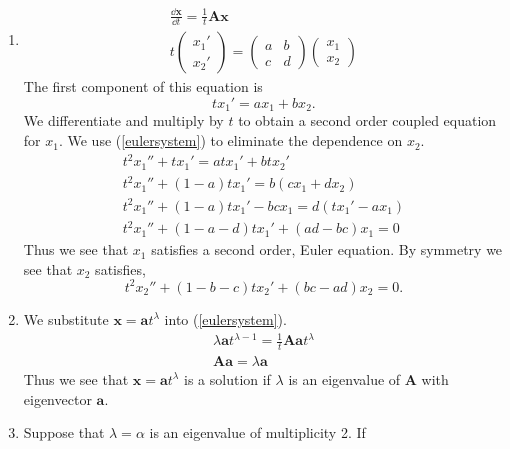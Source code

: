 {%
\begin{Solution}
  \label{solution dxdt=1tAx}
  \begin{enumerate}
  \item
    \begin{gather*}
      \frac{\dd \mathbf{x}}{\dd t} = \frac{1}{t} \mathbf{A} \mathbf{x} \\
      t \begin{pmatrix} x_1' \\ x_2' \end{pmatrix} = 
      \begin{pmatrix} a & b \\ c & d \end{pmatrix}
      \begin{pmatrix} x_1 \\ x_2 \end{pmatrix}
    \end{gather*}
    The first component of this equation is
    \[
    t x_1' = a x_1 + b x_2.
    \]
    We differentiate and multiply by $t$ to obtain a second order coupled 
    equation for $x_1$.  We use (\ref{eulersystem}) to eliminate the 
    dependence on $x_2$.
    \begin{gather*}
      t^2 x_1'' + t x_1' = a t x_1' + b t x_2' \\
      t^2 x_1'' + (1 - a) t x_1' = b (c x_1 + d x_2) \\
      t^2 x_1'' + (1 - a) t x_1' - b c x_1 =  d (t x_1' - a x_1) \\
      t^2 x_1'' + (1 - a - d) t x_1' + (a d - b c) x_1 = 0
    \end{gather*}
    Thus we see that $x_1$ satisfies a second order, Euler equation.  By
    symmetry we see that $x_2$ satisfies,
    \[
    t^2 x_2'' + (1 - b - c) t x_2' + (b c - a d) x_2 = 0.
    \]
  \item
    We substitute $\mathbf{x} = \mathbf{a} t^\lambda$ into (\ref{eulersystem}).
    \begin{gather*}
      \lambda \mathbf{a} t^{\lambda-1} = \frac{1}{t} \mathbf{A} \mathbf{a} t^{\lambda} \\
      \mathbf{A} \mathbf{a} = \lambda \mathbf{a}
    \end{gather*}
    Thus we see that $\mathbf{x} = \mathbf{a} t^{\lambda}$ is a solution if $\lambda$ 
    is an eigenvalue of $\mathbf{A}$ with eigenvector $\mathbf{a}$.
  \item
    Suppose that $\lambda = \alpha$ is an eigenvalue of multiplicity 2.  If

\end{enumerate}
\end{Solution}}
